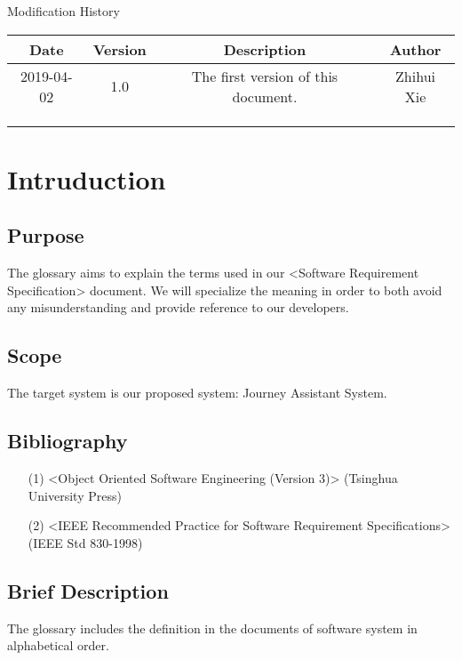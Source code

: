 \documentclass[10pt]{article}
\begin{document}
\newpage

\begin{center}
    {\LARGE Modification History}
    
    \begin{tabular}{|c|c|c|c|} 
        \hline 
        Date&Version&Description&Author\\
        \hline  
        2019-04-02&1.0&The first version of this document.&Zhihui Xie\\
		\hline 
		& & & \\
		\hline
		& & & \\
		\hline
		& & & \\
		\hline
    \end{tabular}    
\end{center}

\newpage

\tableofcontents
\newpage

\section{Intruduction}
\subsection{Purpose}
The glossary aims to explain the terms used in our <Software Requirement Specification> document. We will specialize the meaning in order to both avoid any misunderstanding and provide reference to our developers.

\subsection{Scope}
The target system is our proposed system: Journey Assistant System.

\subsection{Bibliography}
\begin{itemize}
    \item[(1)] <Object Oriented Software Engineering (Version 3)> (Tsinghua University Press)
    \item[(2)] <IEEE Recommended Practice for Software Requirement Specifications> (IEEE Std 830-1998)
\end{itemize}

\subsection{Brief Description}
The glossary includes the definition in the documents of software system in alphabetical order.
\end{document}
